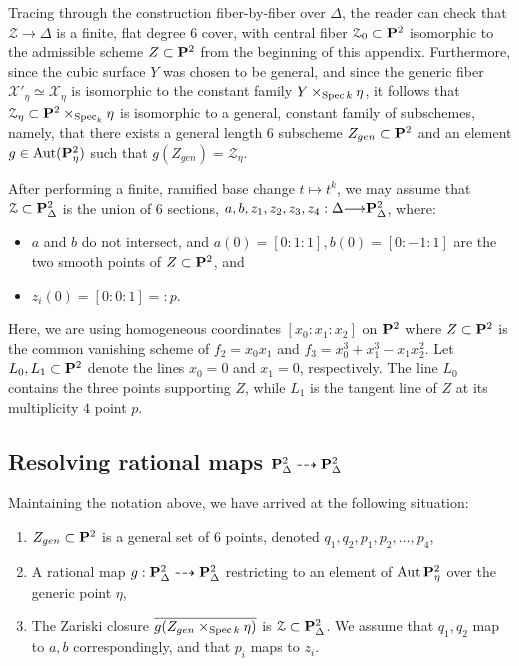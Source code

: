 \documentclass[12pt,reqno]{amsart}
\renewcommand{\k}{k}
\renewcommand{\to}{{\longrightarrow}}
\numberwithin{equation}{section}
\begin{document}
Tracing through the construction fiber-by-fiber over $\Delta$, the
reader can check that $\mathcal{Z} \to \Delta$ is a finite, flat
degree $6$ cover, with central fiber $\mathcal{Z}_{0} \subset \P^{2}$
isomorphic to the admissible scheme $Z \subset \P^{2}$ from the
beginning of this appendix.  Furthermore, since the cubic surface $Y$
was chosen to be general, and since the generic fiber
$\mathcal{X'}_{\eta} \simeq \mathcal{X}_{\eta}$ is isomorphic to the
constant family $Y \times _{\spec \k} \eta$, it follows that
$\mathcal{Z}_{\eta} \subset \P^{2} \times_{\spec _{\k}} \eta$ is
isomorphic to a general, constant family of subschemes, namely, that
there exists a general length $6$ subscheme $Z_{gen} \subset \P^{2}$
and an element $g \in \Aut (\P^{2}_{\eta})$ such that
$g(Z_{gen}) = \mathcal{Z}_{\eta}$.

After performing a finite, ramified base change $t \mapsto t^{k}$, we
may assume that $\mathcal{Z} \subset \P^{2}_{\Delta}$ is the union of
$6$ sections,
$a, b, z_{1}, z_{2}, z_{3}, z_{4}: \Delta \to \P^{2}_{\Delta}$, where:
\begin{itemize}
\item $a$ and $b$ do not intersect, and
  $a(0) = [0:1:1], b(0) = [0:-1:1]$ are the two smooth points of
  $Z \subset \P^{2}$, and
\item $z_{i}(0) =[0:0:1] =: p$.
\end{itemize}
Here, we are using homogeneous coordinates $[x_0 :x_1 : x_2]$ on
$\P^{2}$ where $Z \subset \P^{2}$ is the common vanishing scheme of
$f_{2} = x_0 x_1$ and $f_3 = x_0^3+x_1^3-x_1x_2^2$.  Let
$L_{0}, L_{1} \subset \P^{2}$ denote the lines $x_0 = 0$ and $x_1=0$,
respectively. The line $L_0$ contains the three points supporting $Z$, while
$L_1$ is the tangent line of $Z$ at its multiplicity $4$ point $p$.


\subsection{Resolving rational maps $\P^{2}_{\Delta} \dashrightarrow \P^{2}_{\Delta}$}
\label{sec:resolv-rati-maps}

Maintaining the notation above, we have arrived at the following
situation:
\begin{enumerate}
\item $Z_{gen} \subset \P^{2}$ is a general set of $6$ points, denoted $q_{1}, q_{2}, p_{1}, p_{2}, \dots, p_{4}$,\\
\item A rational map
  $g : \P^{2}_{\Delta} \dashrightarrow \P^{2}_{\Delta}$ restricting to
  an element of $\Aut \P^{2}_{\eta}$ over the generic point $\eta$, \\
\item The Zariski closure
  $\overline{g(Z_{gen} \times_{\spec \k} \eta)}$ is
  $\mathcal{Z} \subset \P^{2}_{\Delta}$.  We assume that
  $q_{1}, q_{2}$ map to $a,b$ correspondingly, and that $p_{i}$ maps
  to $z_{i}$.
\end{enumerate}
\end{document}
